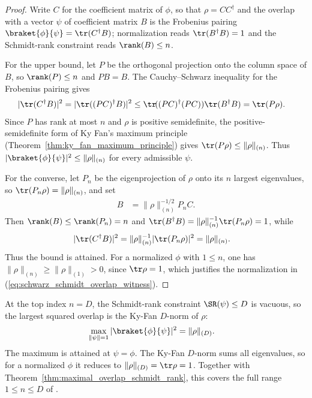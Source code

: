 \begin{proof}
    \leanok
    Write $C$ for the coefficient matrix of $\phi$, so that
    $\rho=CC^\dagger$ and the overlap with a vector $\psi$ of coefficient
    matrix $B$ is the Frobenius pairing
    $\braket{\phi}{\psi}=\tr(C^\dagger B)$; normalization reads
    $\tr(B^\dagger B)=1$ and the Schmidt-rank constraint reads
    $\rank(B)\le n$.

    For the upper bound, let $P$ be the orthogonal projection onto the column
    space of $B$, so $\rank(P)\le n$ and $PB=B$. The Cauchy--Schwarz inequality
    for the Frobenius pairing gives
    \begin{align}
        |\tr(C^\dagger B)|^2
         & =|\tr((PC)^\dagger B)|^2
        \le \tr\!((PC)^\dagger(PC))\tr(B^\dagger B)
        =\tr(P\rho).
        \notag
    \end{align}
    Since $P$ has rank at most $n$ and $\rho$ is positive semidefinite, the
    positive-semidefinite form of Ky Fan's maximum principle
    (Theorem~\ref{thm:ky_fan_maximum_principle}) gives
    $\tr(P\rho)\le \|\rho\|_{(n)}$. Thus
    $|\braket{\phi}{\psi}|^2\le\|\rho\|_{(n)}$ for every admissible $\psi$.

    For the converse, let $P_n$ be the eigenprojection of $\rho$ onto its $n$
    largest eigenvalues, so $\tr(P_n\rho)=\|\rho\|_{(n)}$, and set
    \begin{align}
        B
         & =\|\rho\|_{(n)}^{-1/2}P_nC.
        \label{eq:schwarz_schmidt_overlap_witness}
    \end{align}
    Then $\rank(B)\le\rank(P_n)=n$ and
    $\tr(B^\dagger B)=\|\rho\|_{(n)}^{-1}\tr(P_n\rho)=1$, while
    \begin{align}
        |\tr(C^\dagger B)|^2
         & =\|\rho\|_{(n)}^{-1}|\tr(P_n\rho)|^2
        =\|\rho\|_{(n)}.
        \notag
    \end{align}
    Thus the bound is attained. For a normalized $\phi$ with $1\le n$, one
    has $\|\rho\|_{(n)}\ge\|\rho\|_{(1)}>0$, since $\tr\rho=1$, which
    justifies the normalization in
    (\ref{eq:schwarz_schmidt_overlap_witness}).
\end{proof}

\begin{theorem}
    \label{thm:maximal_overlap_schmidt_rank_top}
    \leanok
    At the top index $n=D$, the Schmidt-rank constraint $\SR(\psi)\le D$
    is vacuous, so the largest squared overlap is the Ky-Fan $D$-norm of
    $\rho$:
    \begin{align}
        \max_{\|\psi\|=1}|\braket{\phi}{\psi}|^2
         & =\|\rho\|_{(D)}.
        \label{eq:schwarz_maximal_overlap_top}
    \end{align}
    The maximum is attained at $\psi=\phi$. The Ky-Fan $D$-norm sums all
    eigenvalues, so for a normalized $\phi$ it reduces to
    $\|\rho\|_{(D)}=\tr\rho=1$. Together with
    Theorem~\ref{thm:maximal_overlap_schmidt_rank}, this covers the full range
    $1\le n\le D$ of \cite[Lemma~3.1]{Wolf2012Quantum}.
\end{theorem}

